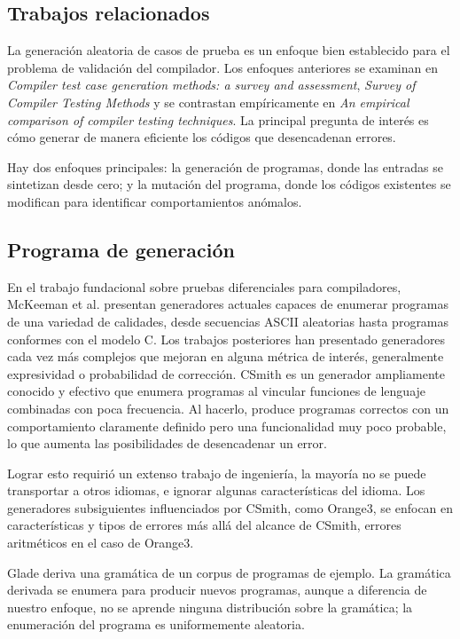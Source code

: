 \subsection{Trabajos relacionados}
La generación aleatoria de casos de prueba es un enfoque bien establecido para el problema de validación del compilador. Los enfoques anteriores se examinan en \textit{Compiler test case generation methods: a survey and assessment}\cite{Boujarwah1997CompilerTC}, \textit{Survey of Compiler Testing Methods}\cite{Kossatchev2005CompilerTM} y se contrastan empíricamente en \textit{An empirical comparison of compiler testing techniques}\cite{ComparisonCompilerTechniques}. La principal pregunta de interés es cómo generar de manera eficiente los códigos que desencadenan errores.

Hay dos enfoques principales: la generación de programas, donde las entradas se sintetizan desde cero; y la mutación del programa, donde los códigos existentes se modifican para identificar comportamientos anómalos.

\subsection{Programa de generación}
En el trabajo fundacional sobre pruebas diferenciales para compiladores, McKeeman et al. presentan generadores actuales capaces de enumerar programas de una variedad de calidades, desde secuencias ASCII aleatorias hasta programas conformes con el modelo C\cite{McKeeman98differentialtesting}. Los trabajos posteriores han presentado generadores cada vez más complejos que mejoran en alguna métrica de interés, generalmente expresividad o probabilidad de corrección. CSmith\cite{Yang:2011:FUB:1993316.1993532} es un generador ampliamente conocido y efectivo que enumera programas al vincular funciones de lenguaje combinadas con poca frecuencia. Al hacerlo, produce programas correctos con un comportamiento claramente definido pero una funcionalidad muy poco probable, lo que aumenta las posibilidades de desencadenar un error. 

Lograr esto requirió un extenso trabajo de ingeniería, la mayoría no se puede transportar a otros idiomas, e ignorar algunas características del idioma. Los generadores subsiguientes influenciados por CSmith, como Orange3\cite{Nagai:Hashimoto:Ishiura}, se enfocan en características y tipos de errores más allá del alcance de CSmith, errores aritméticos en el caso de Orange3.

Glade\cite{Glade:Bastani:Sharma:Aiken:Liang} deriva una gramática de un corpus de programas de ejemplo. La gramática derivada se enumera para producir nuevos programas, aunque a diferencia de nuestro enfoque, no se aprende ninguna distribución sobre la gramática; la enumeración del programa es uniformemente aleatoria.

